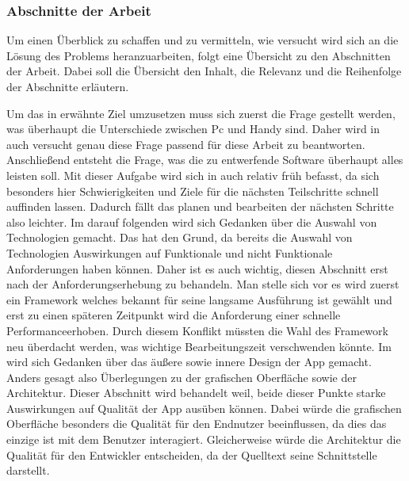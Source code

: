 \subsubsection{Abschnitte der Arbeit}\myCheckmark
Um einen Überblick zu schaffen und zu vermitteln, wie versucht wird sich an die Lösung des Problems heranzuarbeiten, folgt eine Übersicht zu den Abschnitten der Arbeit. Dabei soll die Übersicht den Inhalt, die Relevanz und die Reihenfolge der Abschnitte erläutern.%

\myNewSection%
Um das in  erwähnte Ziel umzusetzen muss sich zuerst die Frage gestellt werden, was überhaupt die Unterschiede zwischen Pc und Handy sind. Daher wird in  auch versucht genau diese Frage passend für diese Arbeit zu beantworten.\newline%
Anschließend entsteht die Frage, was die zu entwerfende Software überhaupt alles leisten soll. Mit dieser Aufgabe wird sich in  auch relativ früh befasst, da sich besonders hier Schwierigkeiten und Ziele für die nächsten Teilschritte schnell auffinden lassen. Dadurch fällt das planen und bearbeiten der nächsten Schritte also leichter.\newline%
Im darauf folgenden  wird sich Gedanken über die Auswahl von Technologien gemacht. Das hat den Grund, da bereits die Auswahl von Technologien Auswirkungen auf Funktionale und nicht Funktionale Anforderungen haben können. Daher ist es auch wichtig, diesen Abschnitt erst nach der Anforderungserhebung zu behandeln.
	Man stelle sich vor es wird zuerst ein Framework welches bekannt für seine langsame Ausführung ist gewählt und erst zu einen späteren Zeitpunkt wird die Anforderung einer \dq schnelle Performance\dq erhoben. Durch diesem Konflikt müssten die Wahl des Framework neu überdacht werden, was wichtige Bearbeitungszeit verschwenden könnte.\newline%
Im  wird sich Gedanken über das äußere sowie innere Design der App gemacht. Anders gesagt also Überlegungen zu der grafischen Oberfläche sowie der Architektur. Dieser Abschnitt wird behandelt weil, beide dieser Punkte starke Auswirkungen auf Qualität der App ausüben können. Dabei würde die grafischen Oberfläche besonders die Qualität für den Endnutzer beeinflussen, da dies das einzige ist mit dem Benutzer interagiert. Gleicherweise würde die Architektur die Qualität für den Entwickler entscheiden, da der Quelltext seine Schnittstelle darstellt.\newline
